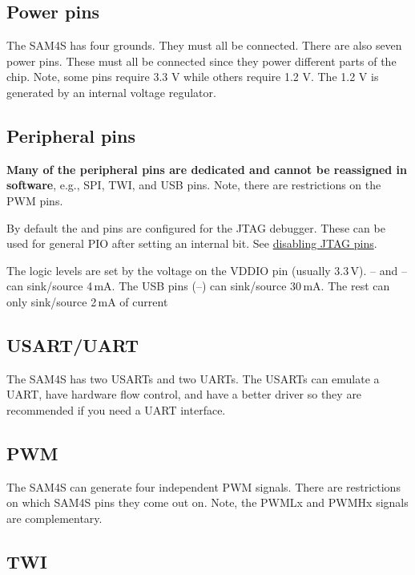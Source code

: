 \subsection{Power pins}\label{power-pins}

The SAM4S has four grounds. They must all be connected. There are also
seven power pins. These must all be connected since they power different
parts of the chip. Note, some pins require 3.3 V while others require
1.2 V. The 1.2 V is generated by an internal voltage regulator.

\subsection{Peripheral pins}\label{peripheral-pins}

\textbf{Many of the peripheral pins are dedicated and cannot be
reassigned in software}, e.g., SPI, TWI, and USB pins. Note, there are
restrictions on the PWM pins.

By default the  and  pins are configured for the JTAG debugger.
These can be used for general PIO after setting an internal bit.  See
\protect\hyperref[disabling-jtag-pins]{disabling JTAG pins}.

The logic levels are set by the voltage on the VDDIO pin (usually
3.3\,V).  -- and -- can sink/source
4\,mA.  The USB pins (--) can sink/source 30\,mA.  The
rest can only sink/source 2\,mA of current


\subsection{USART/UART}\label{usartuart}

The SAM4S has two USARTs and two UARTs. The USARTs can emulate a
UART, have hardware flow control, and have a better driver so they are
recommended if you need a UART interface.


\subsection{PWM}\label{pwm}

The SAM4S can generate four independent PWM signals. There are
restrictions on which SAM4S pins they come out on. Note, the PWMLx and
PWMHx signals are complementary.

\subsection{TWI}\label{twi}

